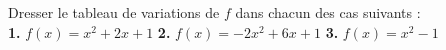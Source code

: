 \begin{Application}[][10 min]
Dresser le tableau de variations de $f$ dans chacun des cas suivants : \\
\textbf{1.} $f(x) = x^2 + 2x + 1$ \qquad 
\textbf{2.} $f(x) = -2x^2 + 6x + 1$ \qquad 
\textbf{3.} $f(x) = x^2 - 1$
\end{Application}
